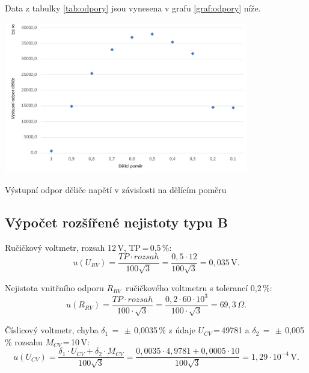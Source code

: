 \documentclass[a4paper,12pt]{article}   %
\newcommand{\ucv}{$U_{CV}$}
\newcommand{\rrv}{$R_{RV}$}
\newcommand{\eucv}{U_{CV}}
\newcommand{\eurv}{U_{RV}}
\newcommand{\errv}{R_{RV}}
\begin{document}
Data z tabulky \ref{tab:odpory} jsou vynesena v grafu \ref{graf:odpory} níže.
\begin{graf}
\centering
    \includegraphics[width = 0.8\textwidth]{graf3.pdf}
    \caption{Výstupní odpor děliče napětí v závislosti na dělícím poměru}
    \label{graf:odpory}
\end{graf}


\subsection{Výpočet rozšířené nejistoty typu B}
Ručičkový voltmetr, rozsah 12\,V, TP\,=\,0,5\,\%:
\begin{equation*}
    u(\eurv)=\frac{TP\cdot rozsah}{100\sqrt{3}}=\frac{0,5\cdot12}{100\sqrt{3}}=0,035\,\textrm{V}.
\end{equation*}

Nejistota vnitřního odporu \rrv ~ručičkového voltmetru s tolerancí 0,2\,\%:
\begin{equation*}
    u(\errv) = \frac{TP\cdot rozsah}{100\cdot\sqrt{3}} = \frac{0,2\cdot 60\cdot 10^3}{100\cdot \sqrt{3}} = 69,3\,\Omega.
\end{equation*}

Číslicový voltmetr, chyba $\delta_1\,=\,\pm$\,0,0035\,\% z údaje \ucv \,=\,49781 a $\delta_2\,=\,\pm$\,0,005\,\% rozsahu $M_{CV}$\,=\,10\,V:
\begin{equation*}
    u(\eucv)=\frac{\delta_1\cdot\eucv + \delta_2\cdot M_{CV}}{100\sqrt{3}}=\frac{0,0035\cdot 4,9781 + 0,0005\cdot 10}{100\sqrt{3}}=1,29\cdot 10^{-4}\,\textrm{V}.
\end{equation*}
\end{document}

